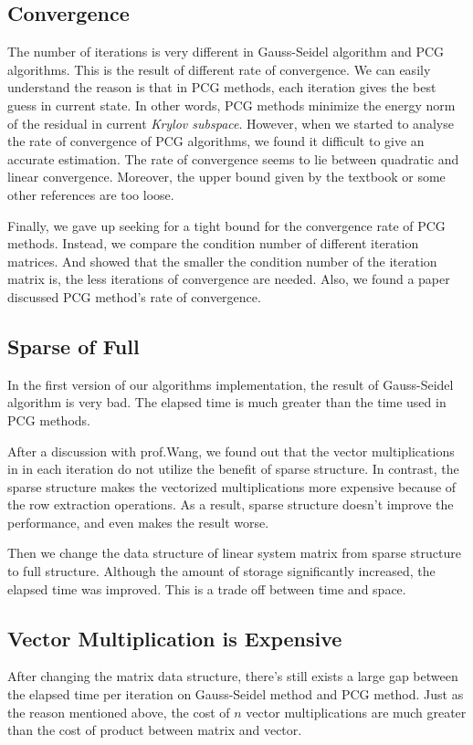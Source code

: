 \documentclass{article}
\begin{document}
\subsection{Convergence}
The number of iterations is very different in Gauss-Seidel algorithm and PCG algorithms. This is the result of different rate of convergence. We can easily understand the reason is that in PCG methods, each iteration gives the best guess in current state. In other words, PCG methods minimize the energy norm of the residual in current {\it Krylov subspace}. However, when we started to analyse the rate of convergence of PCG algorithms, we found it difficult to give an accurate estimation. The rate of convergence seems to lie between quadratic and linear convergence. Moreover, the upper bound given by the textbook or some other references are too loose.

Finally, we gave up seeking for a tight bound for the convergence rate of PCG methods. Instead, we compare the condition number of different iteration matrices. And showed that the smaller the condition number of the iteration matrix is, the less iterations of convergence are needed. Also, we found a paper discussed PCG method's rate of convergence.\cite{CG}


\subsection{Sparse of Full}
In the first version of our algorithms implementation, the result of Gauss-Seidel algorithm is very bad. The elapsed time is much greater than the time used in PCG methods. 

After a discussion with prof.Wang, we found out that the vector multiplications in in each iteration do not utilize the benefit of sparse structure. In contrast, the sparse structure makes the vectorized multiplications more expensive because of the row extraction operations. As a result, sparse structure doesn't improve the performance, and even makes the result worse.

Then we change the data structure of linear system matrix from sparse structure to full structure. Although the amount of storage significantly increased, the elapsed time was improved. This is a trade off between time and space.

\subsection{Vector Multiplication is Expensive}
After changing the matrix data structure, there's still exists a large gap between the elapsed time per iteration on Gauss-Seidel method and PCG method. Just as the reason mentioned above, the cost of $n$ vector multiplications are much greater than the cost of product between matrix and vector. 
\end{document}
